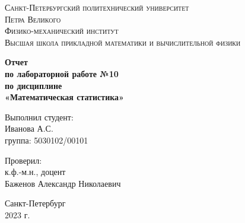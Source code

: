 \begin{titlepage}
	\begin{center}
		\textsc{Санкт-Петербургский политехнический университет\\Петра Великого\\[5mm]
			Физико-механический институт\\[2mm]
			Высшая школа прикладной математики и вычислительной физики}
		
		\vfill
		
		\textbf{Отчет\\по лабораторной работе №10\\по дисциплине\\ «Математическая статистика»
			\\[26mm]
		}
	\end{center}
	
	\begin{flushright}
		Выполнил студент: \\
		Иванова А.С. \\
		группа: 5030102/00101 \\
	\end{flushright}
	
	\begin{flushright}
		Проверил: \\
		к.ф.-м.н., доцент \\
		Баженов Александр Николаевич
	\end{flushright}
	
	\vspace*{\fill}
	\begin{center}
		Санкт-Петербург\\2023 г.
	\end{center}
\end{titlepage}